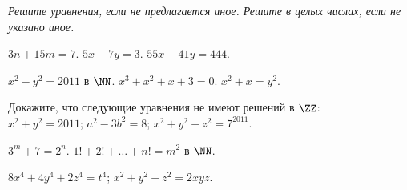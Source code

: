%
%

\emph{%
Решите уравнения, если не предлагается иное.
Решите в целых числах, если не указано иное.}

\begingroup\def\amethod{\vspace{-2ex}\subsubsection*}


\begin{problems}

\item
$3n + 15 m = 7$.
\qquad
\problem
$5 x - 7 y = 3$.
\qquad
\problem
$55 x - 41 y = 444$.

\end{problems}


\begin{problems}

\item
$x^2 - y^2 = 2011$\; в $\NN$.
\qquad
\problem
$x^3 + x^2 + x + 3 = 0$.
\qquad
\problem
$x^2 + x = y^2$.

\end{problems}


\begin{problems}

\item
Докажите, что следующие уравнения не имеют решений в $\ZZ$:
\\
\sbp $x^2 + y^2 = 2011$;
\qquad
\sbp $a^2 - 3 b^2 = 8$;
\qquad
\sbp $x^2 + y^2 + z^2 = 7^{2011}$.

\item
$3^m + 7 = 2^n$.
\qquad
\problem
$1! + 2! + \ldots + n! = m^2$\; в $\NN$.

\end{problems}


\begin{problems}

\item
$8 x^4 + 4 y^4 + 2 z^4 = t^4$;
\qquad
\problem
$x^2 + y^2 + z^2 = 2 x y z$.

\end{problems}

